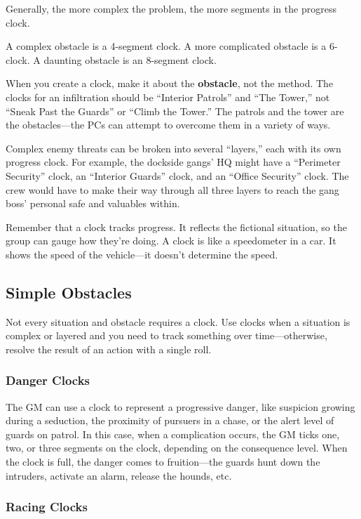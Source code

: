 Generally, the more complex the problem, the more segments in the progress clock.

A complex obstacle is a 4-segment clock. A more complicated obstacle is a 6-clock. A daunting obstacle is an 8-segment clock.

When you create a clock, make it about the \textbf{obstacle}, not the method. The clocks for an infiltration should be ``Interior Patrols'' and ``The Tower,'' not ``Sneak Past the Guards'' or ``Climb the Tower.'' The patrols and the tower are the obstacles­—the PCs can attempt to overcome them in a variety of ways.

Complex enemy threats can be broken into several ``layers,'' each with its own progress clock. For example, the dockside gangs’ HQ might have a ``Perimeter Security'' clock, an ``Interior Guards'' clock, and an ``Office Security'' clock. The crew would have to make their way through all three layers to reach the gang boss’ personal safe and valuables within.

Remember that a clock tracks progress. It reflects the fictional situation, so the group can gauge how they’re doing. A clock is like a speedometer in a car. It shows the speed of the vehicle—it doesn’t determine the speed.

\subsection{Simple Obstacles}

Not every situation and obstacle requires a clock. Use clocks when a situation is complex or layered and you need to track something over time—otherwise, resolve the result of an action with a single roll.

\subsubsection{Danger Clocks}

The GM can use a clock to represent a progressive danger, like suspicion growing during a seduction, the proximity of pursuers in a chase, or the alert level of guards on patrol. In this case, when a complication occurs, the GM ticks one, two, or three segments on the clock, depending on the consequence level. When the clock is full, the danger comes to fruition—the guards hunt down the intruders, activate an alarm, release the hounds, etc.

\subsubsection{Racing Clocks}

